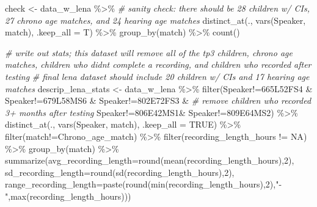 \documentclass[
]{article}
\newenvironment{Shaded}{\begin{snugshade}}{\end{snugshade}}
\newcommand{\AttributeTok}[1]{\textcolor[rgb]{0.77,0.63,0.00}{#1}}
\newcommand{\CommentTok}[1]{\textcolor[rgb]{0.56,0.35,0.01}{\textit{#1}}}
\newcommand{\ConstantTok}[1]{\textcolor[rgb]{0.00,0.00,0.00}{#1}}
\newcommand{\DecValTok}[1]{\textcolor[rgb]{0.00,0.00,0.81}{#1}}
\newcommand{\FunctionTok}[1]{\textcolor[rgb]{0.00,0.00,0.00}{#1}}
\newcommand{\NormalTok}[1]{#1}
\newcommand{\OtherTok}[1]{\textcolor[rgb]{0.56,0.35,0.01}{#1}}
\newcommand{\SpecialCharTok}[1]{\textcolor[rgb]{0.00,0.00,0.00}{#1}}
\newcommand{\StringTok}[1]{\textcolor[rgb]{0.31,0.60,0.02}{#1}}
\begin{document}
\begin{Shaded}
\begin{Highlighting}[]
\NormalTok{check }\OtherTok{\textless{}{-}}\NormalTok{ data\_w\_lena }\SpecialCharTok{\%\textgreater{}\%} \CommentTok{\# sanity check: there should be 28 children w/ CIs, 27 chrono age matches, and 24 hearing age matches}
  \FunctionTok{distinct\_at}\NormalTok{(., }\FunctionTok{vars}\NormalTok{(Speaker, match), }\AttributeTok{.keep\_all =}\NormalTok{ T) }\SpecialCharTok{\%\textgreater{}\%} 
  \FunctionTok{group\_by}\NormalTok{(match) }\SpecialCharTok{\%\textgreater{}\%} 
  \FunctionTok{count}\NormalTok{()}

\CommentTok{\# write out stats; this dataset will remove all of the tp3 children, chrono age matches, children who didn\textquotesingle{}t complete a recording, and children who recorded after testing}
\CommentTok{\# final lena dataset should include 20 children w/ CIs and 17 hearing age matches }
\NormalTok{descrip\_lena\_stats }\OtherTok{\textless{}{-}}\NormalTok{ data\_w\_lena }\SpecialCharTok{\%\textgreater{}\%} 
   \FunctionTok{filter}\NormalTok{(Speaker}\SpecialCharTok{!=}\StringTok{\textquotesingle{}665L52FS4\textquotesingle{}} \SpecialCharTok{\&}\NormalTok{ Speaker}\SpecialCharTok{!=}\StringTok{\textquotesingle{}679L58MS6\textquotesingle{}} \SpecialCharTok{\&}\NormalTok{ Speaker}\SpecialCharTok{!=}\StringTok{\textquotesingle{}802E72FS3\textquotesingle{}} \SpecialCharTok{\&} \CommentTok{\# remove children who recorded 3+ months after testing}
\NormalTok{           Speaker}\SpecialCharTok{!=}\StringTok{\textquotesingle{}806E42MS1\textquotesingle{}}\SpecialCharTok{\&}\NormalTok{ Speaker}\SpecialCharTok{!=}\StringTok{\textquotesingle{}809E64MS2\textquotesingle{}}\NormalTok{) }\SpecialCharTok{\%\textgreater{}\%}
  \FunctionTok{distinct\_at}\NormalTok{(., }\FunctionTok{vars}\NormalTok{(Speaker, match), }\AttributeTok{.keep\_all =} \ConstantTok{TRUE}\NormalTok{) }\SpecialCharTok{\%\textgreater{}\%}
  \FunctionTok{filter}\NormalTok{(match}\SpecialCharTok{!=}\StringTok{\textquotesingle{}Chrono\_age\_match\textquotesingle{}}\NormalTok{) }\SpecialCharTok{\%\textgreater{}\%}
  \FunctionTok{filter}\NormalTok{(recording\_length\_hours }\SpecialCharTok{!=} \StringTok{\textquotesingle{}NA\textquotesingle{}}\NormalTok{) }\SpecialCharTok{\%\textgreater{}\%}
  \FunctionTok{group\_by}\NormalTok{(match) }\SpecialCharTok{\%\textgreater{}\%}
  \FunctionTok{summarize}\NormalTok{(}\AttributeTok{avg\_recording\_length=}\FunctionTok{round}\NormalTok{(}\FunctionTok{mean}\NormalTok{(recording\_length\_hours),}\DecValTok{2}\NormalTok{),}
            \AttributeTok{sd\_recording\_length=}\FunctionTok{round}\NormalTok{(}\FunctionTok{sd}\NormalTok{(recording\_length\_hours),}\DecValTok{2}\NormalTok{),}
            \AttributeTok{range\_recording\_length=}\FunctionTok{paste}\NormalTok{(}\FunctionTok{round}\NormalTok{(}\FunctionTok{min}\NormalTok{(recording\_length\_hours),}\DecValTok{2}\NormalTok{),}\StringTok{"{-}"}\NormalTok{,}\FunctionTok{max}\NormalTok{(recording\_length\_hours)))}
\end{Highlighting}
\end{Shaded}
\end{document}
